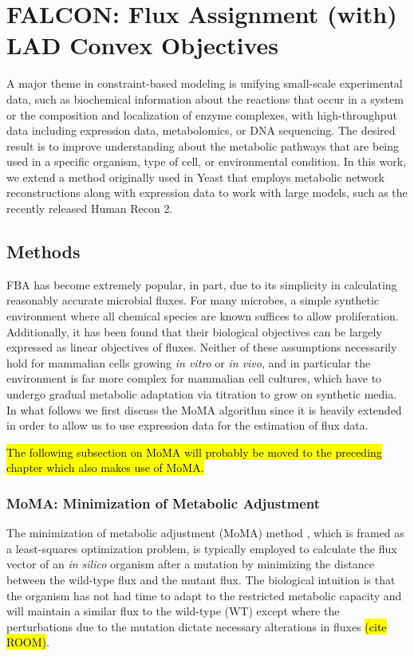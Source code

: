 \documentclass[phd,tocprelim]{cornell}
\theoremstyle{break}
\theoremstyle{empty}
\begin{document}
\chapter{FALCON: Flux Assignment (with) LAD Convex Objectives}

A major theme in constraint-based modeling is unifying small-scale
experimental data, such as biochemical information about the reactions
that occur in a system or the composition and localization of enzyme
complexes, with high-throughput data including expression data,
metabolomics, or DNA sequencing. The desired result is to improve
understanding about the metabolic pathways that are being used in a
specific organism, type of cell, or environmental condition.  In this
work, we extend a method originally used in Yeast that employs
metabolic network reconstructions along with expression data to work
with large models, such as the recently released Human Recon 2.

\section{Methods}
%
%
FBA has become extremely popular, in part, due to its simplicity in
calculating reasonably accurate microbial fluxes. For many microbes, a
simple synthetic environment where all chemical species are known
suffices to allow proliferation. Additionally, it has been found that
their biological objectives can be largely expressed as linear
objectives of fluxes.  Neither of these assumptions necessarily hold
for mammalian cells growing \emph{in vitro} or \emph{in vivo}, and in
particular the environment is far more complex for mammalian cell
cultures, which have to undergo gradual metabolic adaptation via
titration to grow on synthetic media. In what follows we first discuss
the MoMA algorithm since it is heavily extended in order to allow us
to use expression data for the estimation of flux data.

\hl{The following subsection on MoMA will probably be moved to the
preceding chapter which also makes use of MoMA.}

\subsection{MoMA: Minimization of Metabolic Adjustment}

The minimization of metabolic adjustment (MoMA) method \cite{Segre2002}, 
which is framed as a least-squares optimization problem, is typically employed
to calculate the flux vector of an \emph{in silico} organism after a
mutation by minimizing the distance between the wild-type flux and the
mutant flux. The biological intuition is that the organism has not had
time to adapt to the restricted metabolic capacity and will maintain a
similar flux to the wild-type (WT) except where the perturbations due
to the mutation dictate necessary alterations in fluxes \hl{(cite ROOM)}.
\end{document}
